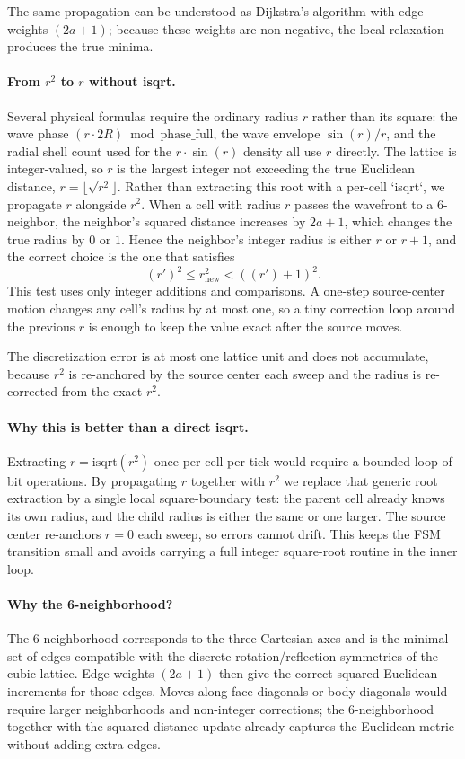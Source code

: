 \documentclass{ijuc}
\begin{document}
The same propagation can be understood as Dijkstra's algorithm with edge weights $(2a+1)$; because these weights are non-negative, the local relaxation produces the true minima.

\paragraph{From $r^{2}$ to $r$ without isqrt.}
Several physical formulas require the ordinary radius $r$ rather than its square: the wave phase $(r\cdot 2R)\bmod\mathrm{phase\_full}$, the wave envelope $\sin(r)/r$, and the radial shell count used for the $r\cdot\sin(r)$ density all use $r$ directly.  The lattice is integer-valued, so $r$ is the largest integer not exceeding the true Euclidean distance, $r=\lfloor\sqrt{r^{2}}\rfloor$.  Rather than extracting this root with a per-cell `isqrt`, we propagate $r$ alongside $r^{2}$.  When a cell with radius $r$ passes the wavefront to a 6-neighbor, the neighbor's squared distance increases by $2a+1$, which changes the true radius by $0$ or $1$.  Hence the neighbor's integer radius is either $r$ or $r+1$, and the correct choice is the one that satisfies
\[
(r')^{2}\le r^{2}_{\text{new}}<((r')+1)^{2}.
\]
This test uses only integer additions and comparisons.  A one-step source-center motion changes any cell's radius by at most one, so a tiny correction loop around the previous $r$ is enough to keep the value exact after the source moves.

The discretization error is at most one lattice unit and does not accumulate, because $r^{2}$ is re-anchored by the source center each sweep and the radius is re-corrected from the exact $r^{2}$.

\paragraph{Why this is better than a direct isqrt.}
Extracting $r=\mathrm{isqrt}(r^{2})$ once per cell per tick would require a bounded loop of bit operations.  By propagating $r$ together with $r^{2}$ we replace that generic root extraction by a single local square-boundary test: the parent cell already knows its own radius, and the child radius is either the same or one larger.  The source center re-anchors $r=0$ each sweep, so errors cannot drift.  This keeps the FSM transition small and avoids carrying a full integer square-root routine in the inner loop.

\paragraph{Why the 6-neighborhood?}
The 6-neighborhood corresponds to the three Cartesian axes and is the minimal set of edges compatible with the discrete rotation/reflection symmetries of the cubic lattice.  Edge weights $(2a+1)$ then give the correct squared Euclidean increments for those edges.  Moves along face diagonals or body diagonals would require larger neighborhoods and non-integer corrections; the 6-neighborhood together with the squared-distance update already captures the Euclidean metric without adding extra edges.
\end{document}
